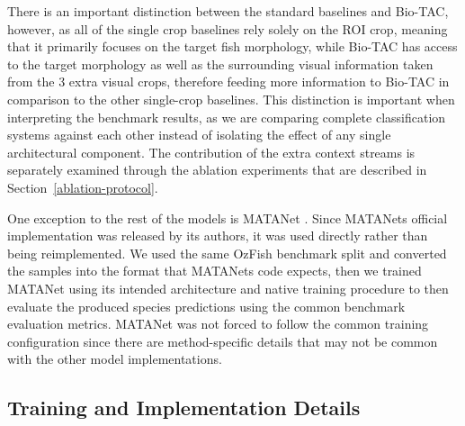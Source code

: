 \documentclass[preprint,12pt]{elsarticle}
\begin{document}
There is an important distinction between the standard baselines and
Bio-TAC, however, as all of the single crop baselines rely solely
on the ROI crop, meaning that it primarily focuses on the target fish
morphology, while Bio-TAC has access to the target morphology as
well as the surrounding visual information taken from the 3 extra visual
crops, therefore feeding more information to Bio-TAC in comparison
to the other single-crop baselines. This distinction is important when
interpreting the benchmark results, as we are comparing complete
classification systems against each other instead of isolating the
effect of any single architectural component. The contribution of the
extra context streams is separately examined through the ablation
experiments that are described in Section~\ref{ablation-protocol}.

One exception to the rest of the models is MATANet
\citep{ref26}. Since MATANet\textquotesingle s
official implementation was released by its authors, it was used
directly rather than being reimplemented. We used the same OzFish
benchmark split and converted the samples into the format that
MATANet\textquotesingle s code expects, then we trained MATANet using
its intended architecture and native training procedure to then evaluate
the produced species predictions using the common benchmark evaluation
metrics. MATANet was not forced to follow the common training
configuration since there are method-specific details that may not be
common with the other model implementations.

\subsection{Training and Implementation
Details}\label{training-and-implementation-details}
\end{document}

